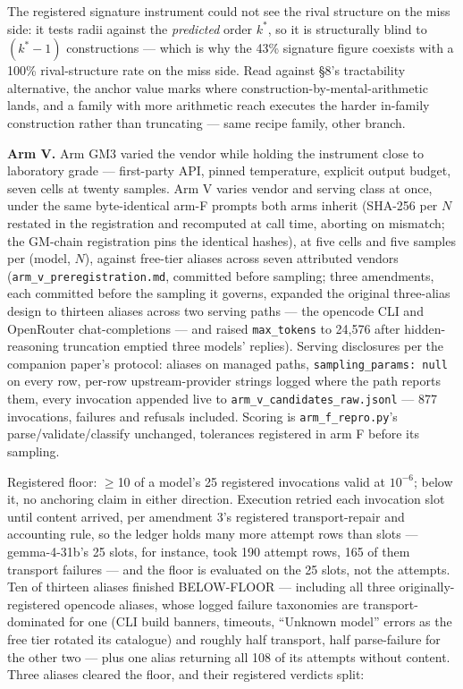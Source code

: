 The registered signature instrument could not see the rival structure on the miss side: it tests
radii against the \emph{predicted} order $k^*$, so it is structurally blind to $(k^*{-}1)$
constructions --- which is why the 43\% signature figure coexists with a 100\% rival-structure rate
on the miss side. Read against \S8's tractability alternative, the anchor value marks where
construction-by-mental-arithmetic lands, and a family with more arithmetic reach executes the
harder in-family construction rather than truncating --- same recipe family, other branch.

\textbf{Arm V.} Arm GM3 varied the vendor while holding the instrument close to laboratory grade ---
first-party API, pinned temperature, explicit output budget, seven cells at twenty samples.
Arm V varies vendor and serving class at once, under the same byte-identical arm-F prompts
both arms inherit (SHA-256 per $N$ restated in the registration and recomputed at call time,
aborting on mismatch; the GM-chain registration pins the identical hashes), at five cells and
five samples per (model, $N$), against free-tier aliases
across seven attributed vendors (\texttt{arm\_v\_preregistration.md}, committed before sampling; three amendments,
each committed before the sampling it governs, expanded the original three-alias design to
thirteen aliases across two serving paths --- the opencode CLI and OpenRouter chat-completions ---
and raised \texttt{max\_tokens} to 24,576 after hidden-reasoning truncation emptied three models'
replies). Serving disclosures per the companion paper's protocol: aliases on managed paths,
\texttt{sampling\_params: null} on every row, per-row upstream-provider strings logged where the path
reports them, every invocation appended live to \texttt{arm\_v\_candidates\_raw.jsonl} --- 877
invocations, failures and refusals included. Scoring is \texttt{arm\_f\_repro.py}'s
parse/validate/classify unchanged, tolerances registered in arm F before its sampling.

Registered floor: $\ge$10 of a model's 25 registered invocations valid at $10^{-6}$; below it, no
anchoring claim in either direction. Execution retried each invocation slot until content
arrived, per amendment 3's registered transport-repair and accounting rule, so the ledger
holds many more attempt rows than slots --- gemma-4-31b's 25 slots, for instance, took 190
attempt rows, 165 of them transport failures --- and the floor is evaluated on the 25 slots,
not the attempts. Ten of thirteen aliases finished BELOW-FLOOR --- including all three
originally-registered opencode aliases, whose logged failure taxonomies are
transport-dominated for one (CLI build banners, timeouts, ``Unknown model'' errors as the
free tier rotated its catalogue) and roughly half transport, half parse-failure for the
other two --- plus one alias returning all 108 of its attempts without content. Three aliases
cleared the floor, and their registered verdicts split:

